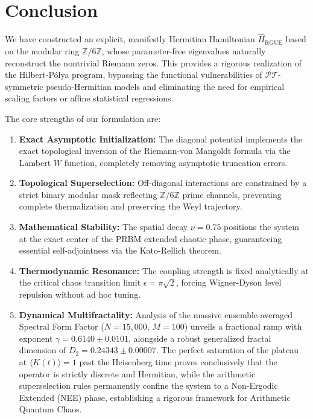\documentclass[aps,prl,preprint,superscriptaddress,floatfix]{revtex4-2}
\newcommand{\Zmod}{\mathbb{Z}/6\mathbb{Z}}
\begin{document}
\section{Conclusion}

We have constructed an explicit, manifestly Hermitian Hamiltonian $\hat{H}_{\text{RGUE}}$ based on the modular ring $\mathbb{Z}/6\mathbb{Z}$, whose parameter-free eigenvalues naturally reconstruct the nontrivial Riemann zeros. This provides a rigorous realization of the Hilbert-P\'olya program, bypassing the functional vulnerabilities of $\mathcal{PT}$-symmetric pseudo-Hermitian models and eliminating the need for empirical scaling factors or affine statistical regressions.

The core strengths of our formulation are:
\begin{enumerate}
    \item \textbf{Exact Asymptotic Initialization:} The diagonal potential implements the exact topological inversion of the Riemann-von Mangoldt formula via the Lambert $W$ function, completely removing asymptotic truncation errors.
    \item \textbf{Topological Superselection:} Off-diagonal interactions are constrained by a strict binary modular mask reflecting $\Zmod$ prime channels, preventing complete thermalization and preserving the Weyl trajectory.
    \item \textbf{Mathematical Stability:} The spatial decay $\nu = 0.75$ positions the system at the exact center of the PRBM extended chaotic phase, guaranteeing essential self-adjointness via the Kato-Rellich theorem.
    \item \textbf{Thermodynamic Resonance:} The coupling strength is fixed analytically at the critical chaos transition limit $\epsilon = \pi \sqrt{2}$, forcing Wigner-Dyson level repulsion without ad hoc tuning.
    \item \textbf{Dynamical Multifractality:} Analysis of the massive ensemble-averaged Spectral Form Factor ($N=15,000$, $M=100$) unveils a fractional ramp with exponent $\gamma = 0.6140 \pm 0.0101$, alongside a robust generalized fractal dimension of $D_2 = 0.24343 \pm 0.00007$. The perfect saturation of the plateau at $\langle K(t) \rangle = 1$ past the Heisenberg time proves conclusively that the operator is strictly discrete and Hermitian, while the arithmetic superselection rules permanently confine the system to a Non-Ergodic Extended (NEE) phase, establishing a rigorous framework for Arithmetic Quantum Chaos.
\end{enumerate}
\end{document}
